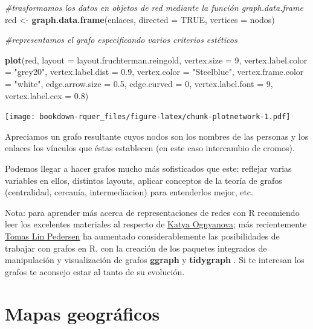 \documentclass[]{book}
\newenvironment{Shaded}{\begin{snugshade}}{\end{snugshade}}
\newcommand{\CommentTok}[1]{\textcolor[rgb]{0.56,0.35,0.01}{\textit{#1}}}
\newcommand{\DataTypeTok}[1]{\textcolor[rgb]{0.13,0.29,0.53}{#1}}
\newcommand{\DecValTok}[1]{\textcolor[rgb]{0.00,0.00,0.81}{#1}}
\newcommand{\FloatTok}[1]{\textcolor[rgb]{0.00,0.00,0.81}{#1}}
\newcommand{\KeywordTok}[1]{\textcolor[rgb]{0.13,0.29,0.53}{\textbf{#1}}}
\newcommand{\NormalTok}[1]{#1}
\newcommand{\OtherTok}[1]{\textcolor[rgb]{0.56,0.35,0.01}{#1}}
\newcommand{\StringTok}[1]{\textcolor[rgb]{0.31,0.60,0.02}{#1}}
\theoremstyle{definition}
\theoremstyle{definition}
\theoremstyle{definition}
\theoremstyle{remark}
\begin{document}
\begin{Shaded}
\begin{Highlighting}[]
\CommentTok{#trasformamos los datos en objetos de red mediante la función graph.data.frame}
\NormalTok{red <-}\StringTok{ }\KeywordTok{graph.data.frame}\NormalTok{(enlaces, }\DataTypeTok{directed =} \OtherTok{TRUE}\NormalTok{, }\DataTypeTok{vertices =}\NormalTok{ nodos)}

\CommentTok{#representamos el grafo especificando varios criterios estéticos}

\KeywordTok{plot}\NormalTok{(red, }\DataTypeTok{layout =}\NormalTok{ layout.fruchterman.reingold, }\DataTypeTok{vertex.size =} \DecValTok{9}\NormalTok{, }
     \DataTypeTok{vertex.label.color =} \StringTok{"grey20"}\NormalTok{, }\DataTypeTok{vertex.label.dist =} \FloatTok{0.9}\NormalTok{, }
     \DataTypeTok{vertex.color =} \StringTok{"Steelblue"}\NormalTok{, }\DataTypeTok{vertex.frame.color =} \StringTok{"white"}\NormalTok{, }
     \DataTypeTok{edge.arrow.size =} \FloatTok{0.5}\NormalTok{, }\DataTypeTok{edge.curved =} \DecValTok{0}\NormalTok{, }\DataTypeTok{vertex.label.font =} \DecValTok{9}\NormalTok{, }
     \DataTypeTok{vertex.label.cex =} \FloatTok{0.8}\NormalTok{)}
\end{Highlighting}
\end{Shaded}

\texttt{[image: bookdown-rquer\_files/figure-latex/chunk-plotnetwork-1.pdf]}

Apreciamos un grafo resultante cuyos nodos son los nombres de las
personas y los enlaces los vínculos que éstas establecen (en este caso
intercambio de cromos).

Podemos llegar a hacer grafos mucho más sofisticados que este: reflejar
varias variables en ellos, distintos layouts, aplicar conceptos de la
teoría de grafos (centralidad, cercanía, intermediacion) para
entenderlos mejor, etc.

Nota: para aprender más acerca de representaciones de redes con R
recomiendo leer los excelentes materiales al respecto de
\href{https://kateto.net/}{Katya Ognyanova}; más recientemente
\href{https://www.data-imaginist.com/}{Tomas Lin Pedersen} ha aumentado
considerablemente las posibilidades de trabajar con grafos en R, con la
creación de los paquetes integrados de manipulación y visualización de
grafos \textbf{ggraph} \citep{R-ggraph} y \textbf{tidygraph}
\citep{R-tidygraph}. Si te interesan los grafos te aconsejo estar al
tanto de su evolución.

\hypertarget{mapas-geograficos}{%
\section{Mapas geográficos}\label{mapas-geograficos}}
\end{document}
